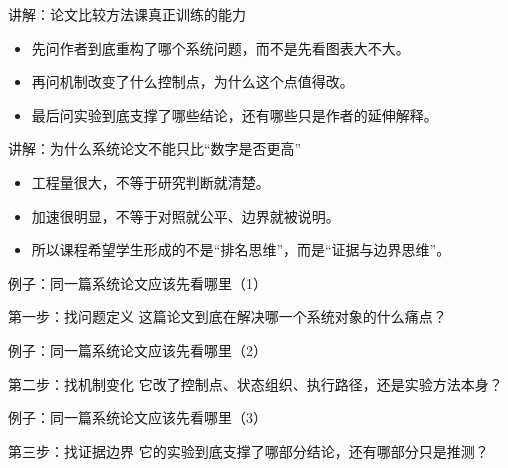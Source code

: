 \begin{frame}{讲解：论文比较方法课真正训练的能力}
  \begin{itemize}
    \item 先问作者到底重构了哪个系统问题，而不是先看图表大不大。
    \item 再问机制改变了什么控制点，为什么这个点值得改。
    \item 最后问实验到底支撑了哪些结论，还有哪些只是作者的延伸解释。
  \end{itemize}
\end{frame}

\begin{frame}{讲解：为什么系统论文不能只比“数字是否更高”}
  \begin{itemize}
    \item 工程量很大，不等于研究判断就清楚。
    \item 加速很明显，不等于对照就公平、边界就被说明。
    \item 所以课程希望学生形成的不是“排名思维”，而是“证据与边界思维”。
  \end{itemize}
\end{frame}

\begin{frame}{例子：同一篇系统论文应该先看哪里（1）}
\begin{block}{第一步：找问题定义}
    这篇论文到底在解决哪一个系统对象的什么痛点？
  \end{block}
\end{frame}

\begin{frame}{例子：同一篇系统论文应该先看哪里（2）}
\begin{block}{第二步：找机制变化}
    它改了控制点、状态组织、执行路径，还是实验方法本身？
  \end{block}
\end{frame}

\begin{frame}{例子：同一篇系统论文应该先看哪里（3）}
\begin{block}{第三步：找证据边界}
    它的实验到底支撑了哪部分结论，还有哪部分只是推测？
  \end{block}
\end{frame}

